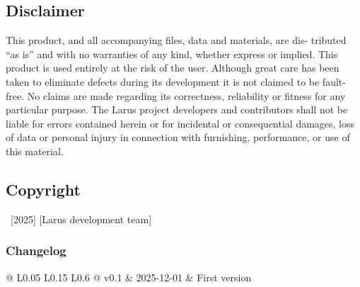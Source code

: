 	\subsection*{Disclaimer}
	This product, and all accompanying files, data and materials, are dis-
	tributed “as is” and with no warranties of any kind, whether express or
	implied. This product is used entirely at the risk of the user. Although
	great care has been taken to eliminate defects during its development
	it is not claimed to be fault-free. No claims are made regarding its
	correctness, reliability or fitness for any particular purpose. The Larus 
	project developers and contributors shall not be liable for errors
	contained herein or for incidental or consequential damages, loss of
	data or personal injury in connection with furnishing, performance, or
	use of this material.
	
	\subsection*{Copyright}
	
	\textcopyright~[2025] [Larus development team] 
	
	
	\vfill %
	
	\subsubsection*{Changelog}
	
	\scriptsize %
	
	\begin{tabular}{@{} L{0.05\linewidth} L{0.15\linewidth} L{0.6\linewidth} @{}} %
		\toprule
		v0.1 & 2025-12-01 & First version\\
		\bottomrule
	\end{tabular}
	\normalsize
